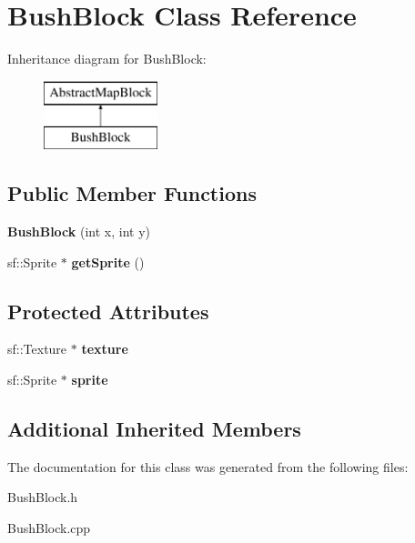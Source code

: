 \hypertarget{class_bush_block}{}\section{Bush\+Block Class Reference}
\label{class_bush_block}
Inheritance diagram for Bush\+Block\+:\begin{figure}[H]
\begin{center}
\leavevmode
\includegraphics[height=2.000000cm]{class_bush_block}
\end{center}
\end{figure}
\subsection*{Public Member Functions}
\begin{DoxyCompactItemize}
\item 
\mbox{\label{class_bush_block_a27d102ac30e12c537e6a8de34ce50779}} 
{\bfseries Bush\+Block} (int x, int y)
\item 
\mbox{\label{class_bush_block_ac6346ab038665e207134bb68ab3f20a1}} 
sf\+::\+Sprite $\ast$ {\bfseries get\+Sprite} ()
\end{DoxyCompactItemize}
\subsection*{Protected Attributes}
\begin{DoxyCompactItemize}
\item 
\mbox{\label{class_bush_block_af04c47ff2490b42258b0b56a6dc1aabe}} 
sf\+::\+Texture $\ast$ {\bfseries texture}
\item 
\mbox{\label{class_bush_block_a24bfc3a63232d1466d9c5ddb7459cf55}} 
sf\+::\+Sprite $\ast$ {\bfseries sprite}
\end{DoxyCompactItemize}
\subsection*{Additional Inherited Members}


The documentation for this class was generated from the following files\+:\begin{DoxyCompactItemize}
\item 
Bush\+Block.\+h\item 
Bush\+Block.\+cpp\end{DoxyCompactItemize}
